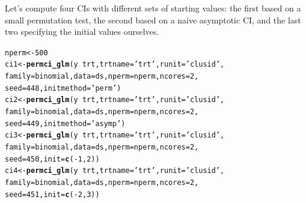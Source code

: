 \documentclass[12pt]{article}\usepackage[]{graphicx}\usepackage[]{color}
\makeatletter
\newcommand{\hlnum}[1]{\textcolor[rgb]{0.686,0.059,0.569}{#1}}%
\newcommand{\hlstr}[1]{\textcolor[rgb]{0.192,0.494,0.8}{#1}}%
\newcommand{\hlopt}[1]{\textcolor[rgb]{0,0,0}{#1}}%
\newcommand{\hlstd}[1]{\textcolor[rgb]{0.345,0.345,0.345}{#1}}%
\newcommand{\hlkwb}[1]{\textcolor[rgb]{0.69,0.353,0.396}{#1}}%
\newcommand{\hlkwc}[1]{\textcolor[rgb]{0.333,0.667,0.333}{#1}}%
\newcommand{\hlkwd}[1]{\textcolor[rgb]{0.737,0.353,0.396}{\textbf{#1}}}%
\newenvironment{kframe}{%
 \def\at@end@of@kframe{}%
 \ifinner\ifhmode%
  \def\at@end@of@kframe{\end{minipage}}%
  \begin{minipage}{\columnwidth}%
 \fi\fi%
 \def\FrameCommand##1{\hskip\@totalleftmargin \hskip-\fboxsep
 \colorbox{shadecolor}{##1}\hskip-\fboxsep
     \hskip-\linewidth \hskip-\@totalleftmargin \hskip\columnwidth}%
 \MakeFramed {\advance\hsize-\width
   \@totalleftmargin\z@ \linewidth\hsize
   \@setminipage}}%
 {\par\unskip\endMakeFramed%
 \at@end@of@kframe}
\newenvironment{knitrout}{}{} %
\makeatother
\begin{document}
Let's compute four CIs with different sets of starting values: the first based on a small permutation test, the second based on a naive asymptotic CI, and the last two specifying the initial values ourselves.
\begin{knitrout}
\color{fgcolor}\begin{kframe}
\begin{alltt}
\hlstd{nperm} \hlkwb{<-} \hlnum{500}
\hlstd{ci1} \hlkwb{<-} \hlkwd{permci_glm}\hlstd{(y} \hlopt{~} \hlstd{trt,} \hlkwc{trtname} \hlstd{=} \hlstr{'trt'}\hlstd{,} \hlkwc{runit} \hlstd{=} \hlstr{'clusid'}\hlstd{,}
                  \hlkwc{family} \hlstd{= binomial,} \hlkwc{data} \hlstd{= ds,} \hlkwc{nperm} \hlstd{= nperm,} \hlkwc{ncores} \hlstd{=} \hlnum{2}\hlstd{,}
                  \hlkwc{seed} \hlstd{=} \hlnum{448}\hlstd{,} \hlkwc{initmethod} \hlstd{=} \hlstr{'perm'}\hlstd{)}
\hlstd{ci2} \hlkwb{<-} \hlkwd{permci_glm}\hlstd{(y} \hlopt{~} \hlstd{trt,} \hlkwc{trtname} \hlstd{=} \hlstr{'trt'}\hlstd{,} \hlkwc{runit} \hlstd{=} \hlstr{'clusid'}\hlstd{,}
                  \hlkwc{family} \hlstd{= binomial,} \hlkwc{data} \hlstd{= ds,} \hlkwc{nperm} \hlstd{= nperm,} \hlkwc{ncores} \hlstd{=} \hlnum{2}\hlstd{,}
                  \hlkwc{seed} \hlstd{=} \hlnum{449}\hlstd{,} \hlkwc{initmethod} \hlstd{=} \hlstr{'asymp'}\hlstd{)}
\hlstd{ci3} \hlkwb{<-} \hlkwd{permci_glm}\hlstd{(y} \hlopt{~} \hlstd{trt,} \hlkwc{trtname} \hlstd{=} \hlstr{'trt'}\hlstd{,} \hlkwc{runit} \hlstd{=} \hlstr{'clusid'}\hlstd{,}
                  \hlkwc{family} \hlstd{= binomial,} \hlkwc{data} \hlstd{= ds,} \hlkwc{nperm} \hlstd{= nperm,} \hlkwc{ncores} \hlstd{=} \hlnum{2}\hlstd{,}
                  \hlkwc{seed} \hlstd{=} \hlnum{450}\hlstd{,} \hlkwc{init} \hlstd{=} \hlkwd{c}\hlstd{(}\hlopt{-}\hlnum{1}\hlstd{,} \hlnum{2}\hlstd{))}
\hlstd{ci4} \hlkwb{<-} \hlkwd{permci_glm}\hlstd{(y} \hlopt{~} \hlstd{trt,} \hlkwc{trtname} \hlstd{=} \hlstr{'trt'}\hlstd{,} \hlkwc{runit} \hlstd{=} \hlstr{'clusid'}\hlstd{,}
                  \hlkwc{family} \hlstd{= binomial,} \hlkwc{data} \hlstd{= ds,} \hlkwc{nperm} \hlstd{= nperm,} \hlkwc{ncores} \hlstd{=} \hlnum{2}\hlstd{,}
                  \hlkwc{seed} \hlstd{=} \hlnum{451}\hlstd{,} \hlkwc{init} \hlstd{=} \hlkwd{c}\hlstd{(}\hlopt{-}\hlnum{2}\hlstd{,} \hlnum{3}\hlstd{))}
\end{alltt}
\end{kframe}
\end{knitrout}
\end{document}
